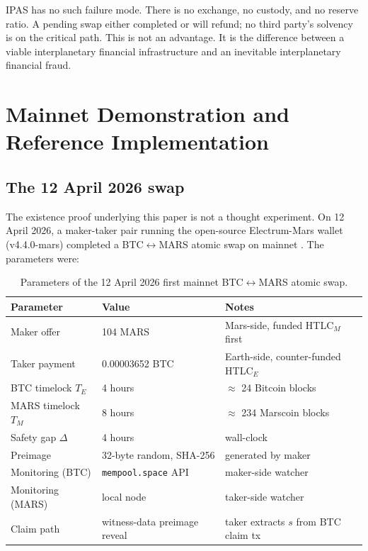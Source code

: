 \documentclass[11pt]{article}
\begin{document}
IPAS has no such failure mode. There is no exchange, no custody, and no reserve ratio. A pending swap either completed or will refund; no third party's solvency is on the critical path. This is not an advantage. It is the difference between a viable interplanetary financial infrastructure and an inevitable interplanetary financial fraud.

\section{Mainnet Demonstration and Reference Implementation}
\label{sec:mainnet}

\subsection{The 12 April 2026 swap}

The existence proof underlying this paper is not a thought experiment. On 12 April 2026, a maker-taker pair running the open-source Electrum-Mars wallet (v4.4.0-mars) completed a BTC$\leftrightarrow$MARS atomic swap on mainnet \citep{marscoin2026firstswap}. The parameters were:

\begin{table}[ht]
\centering
\small
\begin{tabular}{@{}lll@{}}
\toprule
\textbf{Parameter} & \textbf{Value} & \textbf{Notes} \\
\midrule
Maker offer            & 104 MARS             & Mars-side, funded HTLC$_M$ first \\
Taker payment          & 0.00003652 BTC       & Earth-side, counter-funded HTLC$_E$ \\
BTC timelock $T_E$     & 4 hours              & $\approx$ 24 Bitcoin blocks \\
MARS timelock $T_M$    & 8 hours              & $\approx$ 234 Marscoin blocks \\
Safety gap $\Delta$    & 4 hours              & wall-clock \\
Preimage               & 32-byte random, SHA-256 & generated by maker \\
Monitoring (BTC)       & \texttt{mempool.space} API & maker-side watcher \\
Monitoring (MARS)      & local node           & taker-side watcher \\
Claim path             & witness-data preimage reveal & taker extracts $s$ from BTC claim tx \\
\bottomrule
\end{tabular}
\caption{Parameters of the 12 April 2026 first mainnet BTC$\leftrightarrow$MARS atomic swap.}
\label{tab:firstswap}
\end{table}
\end{document}

